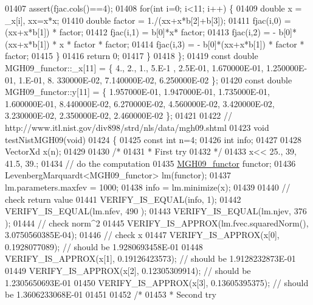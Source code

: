 \begin{DoxyCode}
01407         assert(fjac.cols()==4);
01408         \textcolor{keywordflow}{for}(\textcolor{keywordtype}{int} i=0; i<11; i++) \{
01409             \textcolor{keywordtype}{double} x = \_x[i], xx=x*x;
01410             \textcolor{keywordtype}{double} factor = 1./(xx+x*b[2]+b[3]);
01411             fjac(i,0) = (xx+x*b[1]) * factor;
01412             fjac(i,1) = b[0]*x* factor;
01413             fjac(i,2) = - b[0]*(xx+x*b[1]) * x * factor * factor;
01414             fjac(i,3) = - b[0]*(xx+x*b[1]) * factor * factor;
01415         \}
01416         \textcolor{keywordflow}{return} 0;
01417     \}
01418 \};
01419 \textcolor{keyword}{const} \textcolor{keywordtype}{double} MGH09\_functor::\_x[11] = \{ 4., 2., 1., 5.E-1 , 2.5E-01, 1.670000E-01, 1.250000E-01,  1.E-01, 8.
      330000E-02, 7.140000E-02, 6.250000E-02 \};
01420 \textcolor{keyword}{const} \textcolor{keywordtype}{double} MGH09\_functor::y[11] = \{ 1.957000E-01, 1.947000E-01, 1.735000E-01, 1.600000E-01, 8.440000E-02,
       6.270000E-02, 4.560000E-02, 3.420000E-02, 3.230000E-02, 2.350000E-02, 2.460000E-02 \};
01421 
01422 \textcolor{comment}{// http://www.itl.nist.gov/div898/strd/nls/data/mgh09.shtml}
01423 \textcolor{keywordtype}{void} testNistMGH09(\textcolor{keywordtype}{void})
01424 \{
01425   \textcolor{keyword}{const} \textcolor{keywordtype}{int} n=4;
01426   \textcolor{keywordtype}{int} info;
01427 
01428   VectorXd x(n);
01429 
01430   \textcolor{comment}{/*}
01431 \textcolor{comment}{   * First try}
01432 \textcolor{comment}{   */}
01433   x<< 25., 39, 41.5, 39.;
01434   \textcolor{comment}{// do the computation}
01435   \hyperlink{struct_m_g_h09__functor}{MGH09\_functor} functor;
01436   LevenbergMarquardt<MGH09\_functor> lm(functor);
01437   lm.parameters.maxfev = 1000;
01438   info = lm.minimize(x);
01439 
01440   \textcolor{comment}{// check return value}
01441   VERIFY\_IS\_EQUAL(info, 1); 
01442   VERIFY\_IS\_EQUAL(lm.nfev, 490 ); 
01443   VERIFY\_IS\_EQUAL(lm.njev, 376 ); 
01444   \textcolor{comment}{// check norm^2}
01445   VERIFY\_IS\_APPROX(lm.fvec.squaredNorm(), 3.0750560385E-04);
01446   \textcolor{comment}{// check x}
01447   VERIFY\_IS\_APPROX(x[0], 0.1928077089); \textcolor{comment}{// should be 1.9280693458E-01}
01448   VERIFY\_IS\_APPROX(x[1], 0.19126423573); \textcolor{comment}{// should be 1.9128232873E-01}
01449   VERIFY\_IS\_APPROX(x[2], 0.12305309914); \textcolor{comment}{// should be 1.2305650693E-01}
01450   VERIFY\_IS\_APPROX(x[3], 0.13605395375); \textcolor{comment}{// should be 1.3606233068E-01}
01451 
01452   \textcolor{comment}{/*}
01453 \textcolor{comment}{   * Second try}

\end{DoxyCode}

